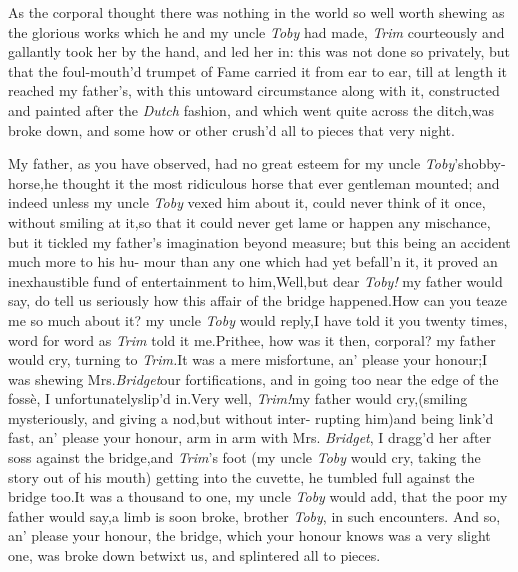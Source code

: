 \documentclass{article}
\begin{document}
As the corporal thought there was no\-thing in the world so well
worth shewing as the glorious works which he and my uncle
\textit{Toby} had made, \textit{Trim} courteous\-ly and gallantly took
her by the hand, and led her in: this was not done so private\-ly,
but that the foul-mouth’d trumpet of
Fame carried it from ear to ear, till at length it reached my
father’s, with this untoward circumstance along with it,\break
{} constructed and
painted after the \textit{Dutch} fashion, and which went quite
across the ditch,\tsk was broke down, and some how or other
crush’d all to pieces that very night.

My father, as you have observed, had no great esteem for my
uncle \textit{Toby}’s\break hobby-horse,\tsk he thought it the most
ri\-diculous horse that ever gentleman mou\-nt\-ed; and indeed unless my
uncle \textit{Toby} vexed him about it, could never think of it once,
without smiling at it,\tsh so that it could never get lame
or happen any mischance, but it tickled my father’s
imagination beyond measure; but this being an accident much more to
his hu- mour than any one which had yet befall’n it, it proved
an inexhaustible fund of entertainment to
him,\tsh Well,\tsh but dear \textit{Toby!} my father
would say, do tell us seriously how this affair of the bridge
happened.\tsh How can you teaze me so much about it? my uncle
\textit{Toby} would reply,\tsk I have told it you twenty times,
word for word as \textit{Trim} told it me.\tsk Pri\-thee, how was
it then, corporal? my father would cry, turning to
\textit{Trim.}\tsk It was a mere misfortune, an’ please your
honour;\tsk I was shewing Mrs.\@ \textit{Bridget}\break our
fortifications, and in going too near the edge of the fossè, I
unfortunately\break slip’d in.\tsk Very well, \textit{Trim!}\@ my
father would cry,\tsh (smiling mysteriously, and\break
giving a nod,\tsh but without inter-\break
rupting him)\tsh and being link’d\break
fast, an’ please your honour, arm in arm with Mrs.\@
\textit{Bridget}, I dragg’d her after 
soss against the bridge,\tsh and \textit{Trim}’s
foot (my uncle \textit{Toby} would cry, taking the story out of
his mouth) getting into the cuvette, he tumbled full against the
bridge too.\tsk It was a thousand to one, my uncle \textit{Toby}
would add, that the poor 
my father would say,\tsh a limb is soon broke, brother
\textit{Toby}, in such encounters.\break
\tsh And so, an’ please your honour, the bridge, which your
honour knows was a very slight one, was broke down betwixt us,
and splintered all to pieces.
\end{document}
